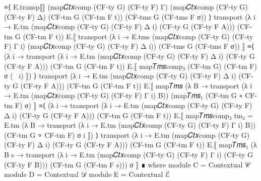 \begin{code}[hide]
    ≡⟨ E.transp⟦⟧ (map𝐶𝑡𝑥comp (CF-ty G) (CF-ty F) Γ) (map𝐶𝑡𝑥comp (CF-ty G) (CF-ty F) Δ)
      (CF-tm G (CF-tm F t)) (CF-tms G (CF-tms F σ)) ⟩
  transport (λ i → E.tm (map𝐶𝑡𝑥comp (CF-ty G) (CF-ty F) Δ i) (CF-ty G (CF-ty F A)))
    (CF-tm G (CF-tm F t)) E.⟦ transport (λ i → E.tms (map𝐶𝑡𝑥comp (CF-ty G) (CF-ty F) Γ i)
      (map𝐶𝑡𝑥comp (CF-ty G) (CF-ty F) Δ i)) (CF-tms G (CF-tms F σ)) ⟧
    ≡⟨ (λ i → transport (λ i → E.tm (map𝐶𝑡𝑥comp (CF-ty G) (CF-ty F) Δ i) (CF-ty G (CF-ty F A)))
      (CF-tm G (CF-tm F t)) E.⟦ map𝑇𝑚𝑠comp₃ (CF-tm G) (CF-tm F) σ (~ i) ⟧) ⟩
  transport (λ i → E.tm (map𝐶𝑡𝑥comp (CF-ty G) (CF-ty F) Δ i) (CF-ty G (CF-ty F A)))
    (CF-tm G (CF-tm F t)) E.⟦ map𝑇𝑚𝑠 (λ {B} → transport
      (λ i → E.tm (map𝐶𝑡𝑥comp (CF-ty G) (CF-ty F) Γ i) B)) (map𝑇𝑚𝑠₁ (CF-tm G ∘ CF-tm F) σ) ⟧
    ≡⟨ (λ i → transport (λ i → E.tm (map𝐶𝑡𝑥comp (CF-ty G) (CF-ty F) Δ i) (CF-ty G (CF-ty F A)))
      (CF-tm G (CF-tm F t)) E.⟦ map𝑇𝑚𝑠comp₂ {tm₂ = E.tm} (λ {B} → transport
        (λ i → E.tm (map𝐶𝑡𝑥comp (CF-ty G) (CF-ty F) Γ i) B)) (CF-tm G ∘ CF-tm F) σ i ⟧) ⟩
  transport (λ i → E.tm (map𝐶𝑡𝑥comp (CF-ty G) (CF-ty F) Δ i) (CF-ty G (CF-ty F A)))
    (CF-tm G (CF-tm F t)) E.⟦ map𝑇𝑚𝑠₁ (λ {B} s → transport
      (λ i → E.tm (map𝐶𝑡𝑥comp (CF-ty G) (CF-ty F) Γ i) (CF-ty G (CF-ty F B)))
      (CF-tm G (CF-tm F s))) σ ⟧
    ∎ where
    module C = Contextual 𝒞
    module D = Contextual 𝒟
    module E = Contextual ℰ
\end{code}
